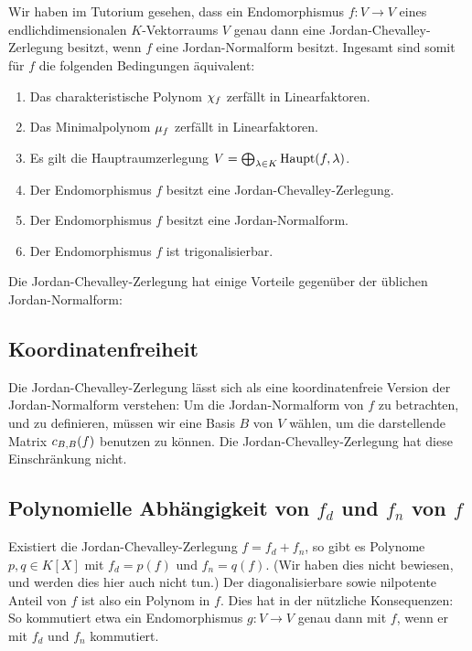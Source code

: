\section{}

Wir haben im Tutorium gesehen, dass ein Endomorphismus $f \colon V \to V$ eines endlichdimensionalen $K$-Vektorraums $V$ genau dann eine Jordan-Chevalley-Zerlegung besitzt, wenn $f$ eine Jordan-Normalform besitzt.
Ingesamt sind somit für $f$ die folgenden Bedingungen äquivalent:

\begin{enumerate}
  \item
    Das charakteristische Polynom $\charpol{f}$ zerfällt in Linearfaktoren.
  \item
    Das Minimalpolynom $\minpol{f}$ zerfällt in Linearfaktoren.
  \item
    Es gilt die Hauptraumzerlegung $V = \bigoplus_{\lambda \in K} \hauptspace{f}{\lambda}$.
  \item
    Der Endomorphismus $f$ besitzt eine Jordan-Chevalley-Zerlegung.
  \item
    Der Endomorphismus $f$ besitzt eine Jordan-Normalform.
  \item
    Der Endomorphismus $f$ ist trigonalisierbar.
\end{enumerate}

Die Jordan-Chevalley-Zerlegung hat einige Vorteile gegenüber der üblichen Jordan-Normalform:





\subsection*{Koordinatenfreiheit}

Die Jordan-Chevalley-Zerlegung lässt sich als eine koordinatenfreie Version der Jordan-Normalform verstehen:
Um die Jordan-Normalform von $f$ zu betrachten, und zu definieren, müssen wir eine Basis $B$ von $V$ wählen, um die darstellende Matrix $\repmatrixendo{f}{B}$ benutzen zu können.
Die Jordan-Chevalley-Zerlegung hat diese Einschränkung nicht.





\subsection*{Polynomielle Abhängigkeit von $f_d$ und $f_n$ von $f$}

Existiert die Jordan-Chevalley-Zerlegung $f = f_d + f_n$, so gibt es Polynome $p, q \in K[X]$ mit $f_d = p(f)$ und $f_n = q(f)$.
(Wir haben dies nicht bewiesen, und werden dies hier auch nicht tun.)
Der diagonalisierbare sowie nilpotente Anteil von $f$ ist also ein Polynom in $f$.
Dies hat in der nützliche Konsequenzen:
So kommutiert etwa ein Endomorphismus $g \colon V \to V$ genau dann mit $f$, wenn er mit $f_d$ und $f_n$ kommutiert.

